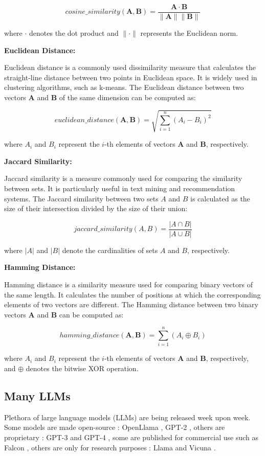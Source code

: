 \documentclass[a4paper,12pt]{article}
\begin{document}
$$cosine\_similarity(\mathbf{A}, \mathbf{B}) = \frac{\mathbf{A} \cdot \mathbf{B}}{\|\mathbf{A}\| \|\mathbf{B}\|}$$

where $\cdot$ denotes the dot product and $\|\cdot\|$ represents the Euclidean norm.

\textbf{Euclidean Distance:}

Euclidean distance is a commonly used dissimilarity measure that calculates the straight-line distance between two points in Euclidean space. It is widely used in clustering algorithms, such as k-means. The Euclidean distance between two vectors $\mathbf{A}$ and $\mathbf{B}$ of the same dimension can be computed as:

$$
euclidean\_distance(\mathbf{A}, \mathbf{B}) = \sqrt{\sum_{i=1}^{n} (A_i - B_i)^2}
$$

where $A_i$ and $B_i$ represent the $i$-th elements of vectors $\mathbf{A}$ and $\mathbf{B}$, respectively.

\textbf{Jaccard Similarity:}

Jaccard similarity \cite{jaccard} is a measure commonly used for comparing the similarity between sets. It is particularly useful in text mining and recommendation systems. The Jaccard similarity between two sets $A$ and $B$ is calculated as the size of their intersection divided by the size of their union:

$$
jaccard\_similarity(A, B) = \frac{|A \cap B|}{|A \cup B|}
$$

where $|A|$ and $|B|$ denote the cardinalities of sets $A$ and $B$, respectively.

\textbf{Hamming Distance:}

Hamming distance \cite{hamming} is a similarity measure used for comparing binary vectors of the same length. It calculates the number of positions at which the corresponding elements of two vectors are different. The Hamming distance between two binary vectors $\mathbf{A}$ and $\mathbf{B}$ can be computed as:

$$
hamming\_distance(\mathbf{A}, \mathbf{B}) = \sum_{i=1}^{n} (A_i \oplus B_i)
$$

where $A_i$ and $B_i$ represent the $i$-th elements of vectors $\mathbf{A}$ and $\mathbf{B}$, respectively, and $\oplus$ denotes the bitwise XOR operation.

\subsection{Many LLMs}
Plethora of large language models (LLMs) are being released week upon week. Some models are made open-source : OpenLlama \cite{openllama}, GPT-2 \cite{gpt2}, others are proprietary : GPT-3\cite{gpt3} and GPT-4 \cite{gpt4}, some are published for commercial use such as Falcon \cite{falcon}, others are only for research purposes : Llama \cite{llama} and Vicuna \cite{vicuna}.
\end{document}
